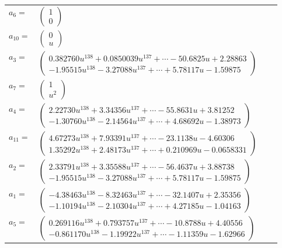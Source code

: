 \documentclass[1p]{elsarticle_modified}
\theoremstyle{definition}
\begin{document}
\begin{tabular}{m{7pt} m{180pt} m{7pt} m{180pt} }
\flushright $a_{6}=$&$\begin{pmatrix}1\\0\end{pmatrix}$ \\
\flushright $a_{10}=$&$\begin{pmatrix}0\\u\end{pmatrix}$ \\
\flushright $a_{3}=$&$\begin{pmatrix}0.382760 u^{138}+0.0850039 u^{137}+\cdots-50.6825 u+2.28863\\-1.95515 u^{138}-3.27088 u^{137}+\cdots+5.78117 u-1.59875\end{pmatrix}$ \\
\flushright $a_{7}=$&$\begin{pmatrix}1\\u^2\end{pmatrix}$ \\
\flushright $a_{4}=$&$\begin{pmatrix}2.22730 u^{138}+3.34356 u^{137}+\cdots-55.8631 u+3.81252\\-1.30760 u^{138}-2.14564 u^{137}+\cdots+4.68692 u-1.38973\end{pmatrix}$ \\
\flushright $a_{11}=$&$\begin{pmatrix}4.67273 u^{138}+7.93391 u^{137}+\cdots-23.1138 u-4.60306\\1.35292 u^{138}+2.48173 u^{137}+\cdots+0.210969 u-0.0658331\end{pmatrix}$ \\
\flushright $a_{2}=$&$\begin{pmatrix}2.33791 u^{138}+3.35588 u^{137}+\cdots-56.4637 u+3.88738\\-1.95515 u^{138}-3.27088 u^{137}+\cdots+5.78117 u-1.59875\end{pmatrix}$ \\
\flushright $a_{1}=$&$\begin{pmatrix}-4.38463 u^{138}-8.32463 u^{137}+\cdots-32.1407 u+2.35356\\-1.10194 u^{138}-2.10304 u^{137}+\cdots+4.27185 u-1.04163\end{pmatrix}$ \\
\flushright $a_{5}=$&$\begin{pmatrix}0.269116 u^{138}+0.793757 u^{137}+\cdots-10.8788 u+4.40556\\-0.861170 u^{138}-1.19922 u^{137}+\cdots-1.11359 u-1.62966\end{pmatrix}$ \\

\end{tabular}
\end{document}
